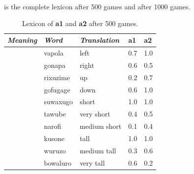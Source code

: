  is the complete lexicon after 500 games and  after 1000 games. 
\begin{table}
\begin{center}
\begin{tabular}{ l  l  l  l  l }
\lsptoprule
{\it Meaning}&{\it Word}&{\it Translation} & {\bf a1}&{\bf a2} \\ \midrule
[HPOS 0.0-0.5]&vapola&left &0.7&1.0\\ \midrule
[HPOS 0.5-1.0]&gonapa&right &0.6&0.5\\ \midrule
[VPOS 0.0-0.5]&rixuzime& up & 0.2&0.7\\ \midrule
[VPOS 0.5-1.0]&gofugage& down &0.6&1.0\\ \midrule
[HEIGHT 0.0-0.5]&suwaxugo&short & 1.0&1.0\\ \midrule
 [HEIGHT 0.0-0.25]&tawube&very short & 0.4&0.5\\ \midrule
 [HEIGHT 0.25-0.5]&narofi&medium short&0.1&0.4\\ \midrule
[HEIGHT 0.5-1.0]&kusone&tall&1.0&1.0\\ \midrule
 [HEIGHT 0.5-0.75]&wuruzo&medium tall&0.3&0.6\\ \midrule
 [HEIGHT 0.75-1.0]&bowaluro&very tall&0.6&0.2\\ \midrule
\end{tabular}
\caption{\label{tab:lex500a} Lexicon of {\bf a1} and {\bf a2} after 500 games.}
\end{center}
\end{table}

